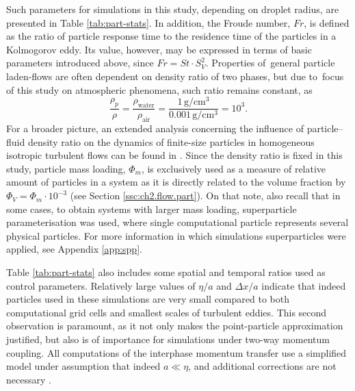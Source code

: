 \documentclass{pracamgren}
\begin{document}
Such parameters for simulations in this study, depending on droplet radius, are presented in Table \ref{tab:part-stats}.
In addition, the Froude number, $Fr$, is defined as the ratio of particle response time to the residence time of the particles in a Kolmogorov eddy.
Its value, however, may be expressed in terms of basic parameters introduced above, since $Fr = St \cdot S_V^2$.
Properties of~general particle laden-flows are often dependent on density ratio of two phases, but due to~focus of this study on atmospheric phenomena, such ratio remains constant, as
$$
\frac{\rho_p}{\rho} 
= \frac{\rho_{\text{water}}}{\rho_{\text{air}}} 
= \frac{1 \, \text{g} / \text{cm}^3}{0.001 \, \text{g} / \text{cm}^3} 
= 10^3 .
$$
For a broader picture, an extended analysis concerning the influence of particle–fluid density ratio on the dynamics of finite-size particles in homogeneous
isotropic turbulent flows can be found in \textcite{Shen2021}.
Since the density ratio is fixed in this study, particle mass loading, $\Phi_m$, is exclusively used as a measure of relative amount of particles in a system as it is directly related to the volume fraction by $\Phi_V = \Phi_m \cdot 10^{-3}$ (see Section \ref{ssc:ch2.flow.part}).
On that note, also recall that in some cases, to obtain systems with larger mass loading, superparticle parameterisation was used, where single computational particle represents several physical particles.
For more information in which simulations superparticles were applied, see Appendix \ref{app:spp}. 

Table \ref{tab:part-stats} also includes some spatial and temporal ratios used as control parameters.
Relatively large values of $\eta / a$ and $\Delta x / a$ indicate that indeed particles used in these simulations are very small compared to both computational grid cells and smallest scales of turbulent eddies.
This second observation is paramount, as it not only makes the point-particle approximation justified, but also is of importance for simulations under two-way momentum coupling. 
All computations of the interphase momentum transfer use a simplified model under assumption that indeed $a \ll \eta$, and additional corrections are not necessary \parencite{Horwitz2016}.

\smallskip
\end{document}
